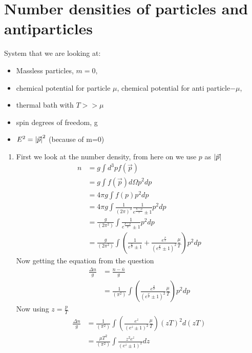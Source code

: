 \section{Number densities of particles and antiparticles}
System that we are looking at: 
\begin{itemize}
\item Massless particles, $m=0$,
\item chemical potential for particle $\mu$, chemical potential for anti particle$-\mu$,
\item thermal bath with $T>>\mu$
\item spin degrees of freedom, g
\item $E^2 = \abs{\vec{p}}^2$ (because of m=0)
\end{itemize}
\begin{enumerate}[label=(\alph*)]
\item First we look at the number density, from here on we use $p$ as $\abs{\vec{p}}$ 
\begin{align}
n 	&= g \int d^{3} p f( \vec{p} ) \\
	&= g \int 	f(\vec{p}) d\Omega p^2 dp \\
	&= 4\pi g \int 	f(p) p^2 dp \\
	&= 4\pi g \int 	\frac{1}{(2\pi)^3} \frac{1}{e^{\frac{E-\mu}{T}}\pm 1}p^2 dp \\
	&= \frac{g}{(2\pi^2)} \int \frac{1}{e^{\frac{p-\mu}{T}}\pm 1}p^2 dp \\
	&= \frac{g}{(2\pi^2)} \int \left( \frac{1}{e^{\frac{p}{T}}\pm 1} + \frac{e^{\frac{p}{T}}}{(e^{\frac{p}{T}}\pm 1)^2}\frac{\mu}{T}\right)p^2 dp 
\end{align}
Now getting the equation from the question
\begin{align}
\frac{\Delta n}{g} 	&= \frac{n-\bar{n}}{g} \\
				&= \frac{1}{(\pi^2)} \int \left( \frac{e^{\frac{p}{T}}}{(e^{\frac{p}{T}}\pm 1)^2}\frac{\mu}{T}\right)p^2 dp 
\end{align}
Now using $z=\frac{p}{T}$
\begin{align}
\frac{\Delta n}{g}	&= \frac{1}{(\pi^2)} \int \left( \frac{e^{z}}{(e^{z}\pm 1)^2} \frac{\mu}{T} \right)(zT)^2 d(zT) \\
				&= \frac{\mu T^2}{(\pi^2)} \int \frac{z^2 e^{z}}{(e^{z} \pm 1)^2} dz \\
\end{align}
\end{enumerate}